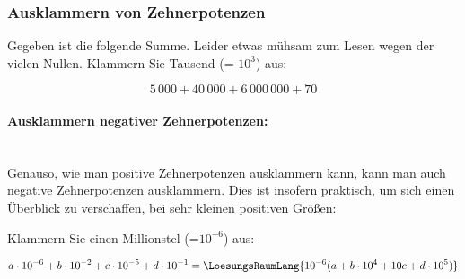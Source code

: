 \subsubsection{Ausklammern von Zehnerpotenzen}
Gegeben ist die folgende Summe. Leider etwas mühsam zum Lesen wegen der vielen Nullen. Klammern Sie Tausend (= $10^3$) aus:

$$5\,000 + 40\,000 + 6\,000\,000 + 70$$


\paragraph{Ausklammern negativer Zehnerpotenzen:}
\,\\

Genauso, wie man positive Zehnerpotenzen ausklammern kann, kann man auch negative Zehnerpotenzen ausklammern. Dies ist insofern praktisch, um sich einen Überblick zu verschaffen, bei sehr kleinen positiven Größen:

Klammern Sie einen Millionstel (=$10^{-6}$) aus:


$$a\cdot{}10^{-6} + b\cdot{}10^{-2} + c\cdot{}10^{-5} + d\cdot{}10^{-1} = \LoesungsRaumLang{10^{-6} (a + b\cdot{}10^4 + 10c + d\cdot{}10^{5})}$$

\newpage
